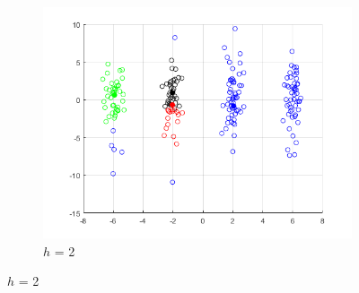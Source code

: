 \documentclass[12pt]{article}
\begin{document}
\begin{figure}[H]
\begin{subfigure}{0.25\textwidth}
  \includegraphics[width=\linewidth]{figs/1-b-meanshift-b-2.png}
  \caption{$h$ = 2}
  \label{fig:3}
\end{subfigure}


\end{figure}
\end{document}
